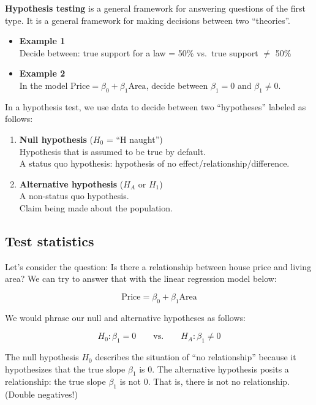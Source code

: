 \documentclass[]{book}
\begin{document}
\textbf{Hypothesis testing} is a general framework for answering questions of the first type. It is a general framework for making decisions between two ``theories''.

\begin{itemize}
\item
  \textbf{Example 1}\\
  Decide between: true support for a law = 50\% vs.~true support \(\neq\) 50\%
\item
  \textbf{Example 2}\\
  In the model \(\text{Price} = \beta_0 + \beta_1\text{Area}\), decide between \(\beta_1 = 0\) and \(\beta_1 \neq 0\).
\end{itemize}

In a hypothesis test, we use data to decide between two ``hypotheses'' labeled as follows:

\begin{enumerate}
\def\labelenumi{\arabic{enumi}.}
\item
  \textbf{Null hypothesis} (\(H_0\) = ``H naught'')\\
  Hypothesis that is assumed to be true by default.\\
  A status quo hypothesis: hypothesis of no effect/relationship/difference.
\item
  \textbf{Alternative hypothesis} (\(H_A\) or \(H_1\))\\
  A non-status quo hypothesis.\\
  Claim being made about the population.
\end{enumerate}

\hypertarget{test-statistics}{%
\subsection{Test statistics}\label{test-statistics}}

Let's consider the question: Is there a relationship between house price and living area? We can try to answer that with the linear regression model below:

\[\text{Price} = \beta_0 + \beta_1\text{Area}\]

We would phrase our null and alternative hypotheses as follows:

\[H_0: \beta_1 = 0 \qquad \text{vs.} \qquad H_A: \beta_1 \neq 0\]

The null hypothesis \(H_0\) describes the situation of ``no relationship'' because it hypothesizes that the true slope \(\beta_1\) is 0. The alternative hypothesis posits a relationship: the true slope \(\beta_1\) is not 0. That is, there is not no relationship. (Double negatives!)
\end{document}
